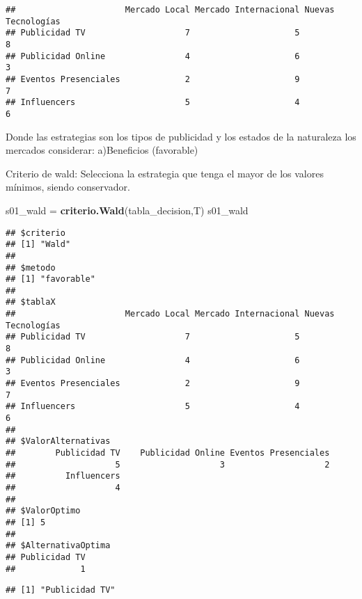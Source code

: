 \documentclass[
]{article}
\newenvironment{Shaded}{\begin{snugshade}}{\end{snugshade}}
\newcommand{\FunctionTok}[1]{\textcolor[rgb]{0.13,0.29,0.53}{\textbf{#1}}}
\newcommand{\NormalTok}[1]{#1}
\newcommand{\OtherTok}[1]{\textcolor[rgb]{0.56,0.35,0.01}{#1}}
\newcommand{\SpecialCharTok}[1]{\textcolor[rgb]{0.81,0.36,0.00}{\textbf{#1}}}
\begin{document}
\begin{verbatim}
##                      Mercado Local Mercado Internacional Nuevas Tecnologías
## Publicidad TV                    7                     5                  8
## Publicidad Online                4                     6                  3
## Eventos Presenciales             2                     9                  7
## Influencers                      5                     4                  6
\end{verbatim}

Donde las estrategias son los tipos de publicidad y los estados de la
naturaleza los mercados considerar: a)Beneficios (favorable)

Criterio de wald: Selecciona la estrategia que tenga el mayor de los
valores mínimos, siendo conservador.

\begin{Shaded}
\begin{Highlighting}[]
\NormalTok{s01\_wald }\OtherTok{=} \FunctionTok{criterio.Wald}\NormalTok{(tabla\_decision,T)}
\NormalTok{s01\_wald}
\end{Highlighting}
\end{Shaded}

\begin{verbatim}
## $criterio
## [1] "Wald"
## 
## $metodo
## [1] "favorable"
## 
## $tablaX
##                      Mercado Local Mercado Internacional Nuevas Tecnologías
## Publicidad TV                    7                     5                  8
## Publicidad Online                4                     6                  3
## Eventos Presenciales             2                     9                  7
## Influencers                      5                     4                  6
## 
## $ValorAlternativas
##        Publicidad TV    Publicidad Online Eventos Presenciales 
##                    5                    3                    2 
##          Influencers 
##                    4 
## 
## $ValorOptimo
## [1] 5
## 
## $AlternativaOptima
## Publicidad TV 
##             1
\end{verbatim}

\begin{Shaded}
\end{Shaded}

\begin{verbatim}
## [1] "Publicidad TV"
\end{verbatim}
\end{document}
